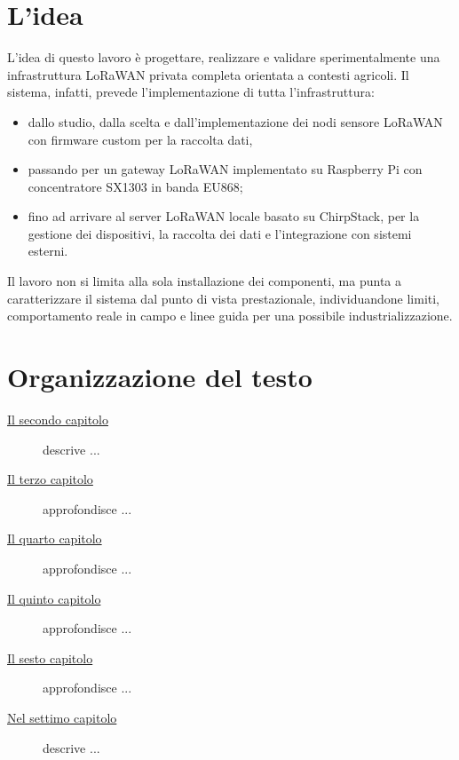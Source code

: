 \section{L'idea}
L'idea di questo lavoro è progettare, realizzare e validare sperimentalmente una infrastruttura LoRaWAN privata completa orientata a contesti agricoli. 
Il sistema, infatti, prevede l'implementazione di tutta l'infrastruttura:
\begin{itemize}
    \item dallo studio, dalla scelta e dall'implementazione dei nodi sensore LoRaWAN con firmware custom per la raccolta dati,
    \item passando per un gateway LoRaWAN implementato su Raspberry Pi con concentratore SX1303 in banda EU868;
    \item fino ad arrivare al server LoRaWAN locale basato su ChirpStack, per la gestione dei dispositivi, la raccolta dei dati e l'integrazione con sistemi esterni.
\end{itemize}
Il lavoro non si limita alla sola installazione dei componenti, ma punta a caratterizzare il sistema dal punto di vista prestazionale, individuandone limiti, comportamento reale in campo e linee guida per una possibile industrializzazione.

\section{Organizzazione del testo}
\begin{description}
    \item[{\hyperref[cap:processi-metodologie]{Il secondo capitolo}}] descrive ...
    
    \item[{\hyperref[cap:descrizione-stage]{Il terzo capitolo}}] approfondisce ...
    
    \item[{\hyperref[cap:analisi-requisiti]{Il quarto capitolo}}] approfondisce ...
    
    \item[{\hyperref[cap:progettazione-codifica]{Il quinto capitolo}}] approfondisce ...
    
    \item[{\hyperref[cap:verifica-validazione]{Il sesto capitolo}}] approfondisce ...
    
    \item[{\hyperref[cap:conclusioni]{Nel settimo capitolo}}] descrive ...
\end{description}

